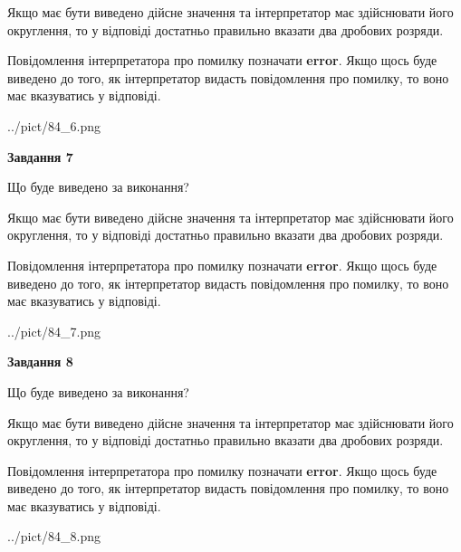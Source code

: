 \documentclass[12pt, ukrainian]{article}
\begin{document}
{\begin {Large}
Якщо має бути виведено дійсне значення та інтерпретатор має здійснювати його округлення, 
то у відповіді достатньо правильно вказати два дробових розряди.

Повідомлення інтерпретатора про помилку позначати \textbf{error}.
Якщо щось буде виведено до того, як інтерпретатор видасть повідомлення про помилку, 
то воно має вказуватись у відповіді. \par

\begin{center}
	{../pict/84_6.png}
\end{center}
\newpage

{\begin {center}\textbf{Завдання 7}\end {center}}\par
Що буде виведено за виконання? \par

Якщо має бути виведено дійсне значення та інтерпретатор має здійснювати його округлення, 
то у відповіді достатньо правильно вказати два дробових розряди.

Повідомлення інтерпретатора про помилку позначати \textbf{error}.
Якщо щось буде виведено до того, як інтерпретатор видасть повідомлення про помилку, 
то воно має вказуватись у відповіді. \par

\begin{center}
	{../pict/84_7.png}
\end{center}
\newpage

{\begin {center}\textbf{Завдання 8}\end {center}}\par
Що буде виведено за виконання? \par

Якщо має бути виведено дійсне значення та інтерпретатор має здійснювати його округлення, 
то у відповіді достатньо правильно вказати два дробових розряди.

Повідомлення інтерпретатора про помилку позначати \textbf{error}.
Якщо щось буде виведено до того, як інтерпретатор видасть повідомлення про помилку, 
то воно має вказуватись у відповіді. \par

\begin{center}
	{../pict/84_8.png}
\end{center}
\newpage


\end{Large}}
\end{document}
